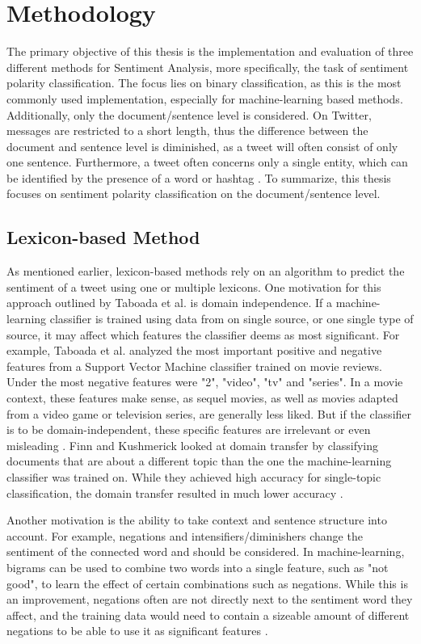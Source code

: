 \chapter{Methodology}
\label{cha:Chapter4_Methodology}
The primary objective of this thesis is the implementation and evaluation of three different methods for Sentiment Analysis, more specifically, the task of sentiment polarity classification. The focus lies on binary classification, as this is the most commonly used implementation, especially for machine-learning based methods. Additionally, only the document/sentence level is considered. On Twitter, messages are restricted to a short length, thus the difference between the document and sentence level is diminished, as a tweet will often consist of only one sentence. Furthermore, a tweet often concerns only a single entity, which can be identified by the presence of a word or hashtag \cite{DBLP:journals/csur/GiachanouC16}. To summarize, this thesis focuses on sentiment polarity classification on the document/sentence level.

\section{Lexicon-based Method}
As mentioned earlier, lexicon-based methods rely on an algorithm to predict the sentiment of a tweet using one or multiple lexicons. One motivation for this approach outlined by Taboada et al. is domain independence. If a machine-learning classifier is trained using data from on single source, or one single type of source, it may affect which features the classifier deems as most significant. For example, Taboada et al. analyzed the most important positive and negative features from a Support Vector Machine classifier trained on movie reviews. Under the most negative features were "2", "video", "tv" and "series". In a movie context, these features make sense, as sequel movies, as well as movies adapted from a video game or television series, are generally less liked. But if the classifier is to be domain-independent, these specific features are irrelevant or even misleading \cite{taboada}. Finn and Kushmerick looked at domain transfer by classifying documents that are about a different topic than the one the machine-learning classifier was trained on. While they achieved high accuracy for single-topic classification, the domain transfer resulted in much lower accuracy \cite{Finn03learningto}.

Another motivation is the ability to take context and sentence structure into account. For example, negations and intensifiers/diminishers change the sentiment of the connected word and should be considered. In machine-learning, bigrams can be used to combine two words into a single feature, such as "not good", to learn the effect of certain combinations such as negations. While this is an improvement, negations often are not directly next to the sentiment word they affect, and the training data would need to contain a sizeable amount of different negations to be able to use it as significant features \cite{taboada}.

